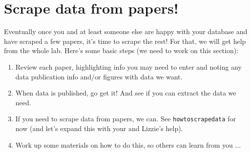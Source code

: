 \documentclass{article}[11pt]
\begin{document}
\section{Scrape data from papers!}

Eventually once you and at least someone else are happy with your database and have scraped a few papers, it's time to scrape the rest! For that, we will get help from the whole lab. Here's some basic steps (we need to work on this section):

\begin{enumerate}
\item Review each paper, highlighting info you may need to enter and noting any data publication info and/or figures with data we want.
\item When data is published, go get it! And see if you can extract the data we need.
\item If you need to scrape data from papers, we can. See \verb|howtoscrapedata| for now (and let's expand this with your and Lizzie's help).
\item Work up some materials on how to do this, so others can learn from you ...
\end{enumerate}
\end{document}
